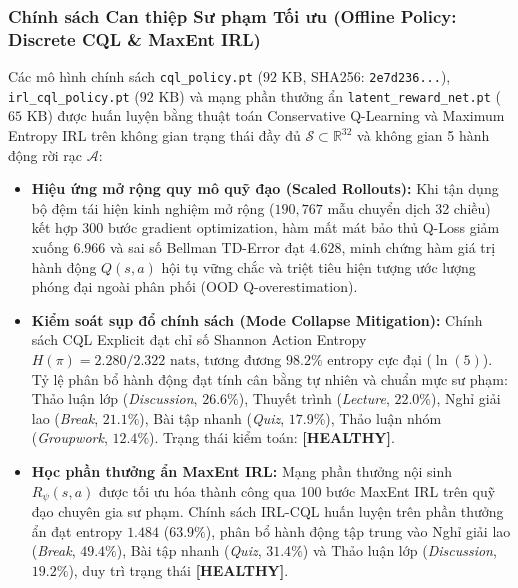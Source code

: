 \subsubsection{Chính sách Can thiệp Sư phạm Tối ưu (Offline Policy: Discrete CQL \& MaxEnt IRL)}
Các mô hình chính sách \texttt{cql\_policy.pt} ($92\text{ KB}$, SHA256: \texttt{2e7d236...}), \texttt{irl\_cql\_policy.pt} ($92\text{ KB}$) và mạng phần thưởng ẩn \texttt{latent\_reward\_net.pt} ($65\text{ KB}$) được huấn luyện bằng thuật toán Conservative Q-Learning và Maximum Entropy IRL trên không gian trạng thái đầy đủ $\mathcal{S} \subset \mathbb{R}^{32}$ và không gian 5 hành động rời rạc $\mathcal{A}$:
\begin{itemize}
  \item \textbf{Hiệu ứng mở rộng quy mô quỹ đạo (Scaled Rollouts):} Khi tận dụng bộ đệm tái hiện kinh nghiệm mở rộng ($190,767$ mẫu chuyển dịch 32 chiều) kết hợp 300 bước gradient optimization, hàm mất mát bảo thủ Q-Loss giảm xuống $\mathbf{6.966}$ và sai số Bellman TD-Error đạt $\mathbf{4.628}$, minh chứng hàm giá trị hành động $Q(s, a)$ hội tụ vững chắc và triệt tiêu hiện tượng ước lượng phóng đại ngoài phân phối (OOD Q-overestimation).
  \item \textbf{Kiểm soát sụp đổ chính sách (Mode Collapse Mitigation):} Chính sách CQL Explicit đạt chỉ số Shannon Action Entropy $H(\pi) = 2.280 / 2.322\text{ nats}$, tương đương $\mathbf{98.2\%}$ entropy cực đại ($\ln(5)$). Tỷ lệ phân bổ hành động đạt tính cân bằng tự nhiên và chuẩn mực sư phạm: Thảo luận lớp (\textit{Discussion}, $26.6\%$), Thuyết trình (\textit{Lecture}, $22.0\%$), Nghỉ giải lao (\textit{Break}, $21.1\%$), Bài tập nhanh (\textit{Quiz}, $17.9\%$), Thảo luận nhóm (\textit{Groupwork}, $12.4\%$). Trạng thái kiểm toán: \textbf{[HEALTHY]}.
  \item \textbf{Học phần thưởng ẩn MaxEnt IRL:} Mạng phần thưởng nội sinh $R_\psi(s, a)$ được tối ưu hóa thành công qua 100 bước MaxEnt IRL trên quỹ đạo chuyên gia sư phạm. Chính sách IRL-CQL huấn luyện trên phần thưởng ẩn đạt entropy $1.484$ ($63.9\%$), phân bổ hành động tập trung vào Nghỉ giải lao (\textit{Break}, $49.4\%$), Bài tập nhanh (\textit{Quiz}, $31.4\%$) và Thảo luận lớp (\textit{Discussion}, $19.2\%$), duy trì trạng thái \textbf{[HEALTHY]}.
\end{itemize}

